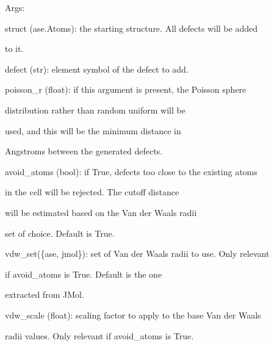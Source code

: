 \documentclass[letterpaper,10pt,english]{sphinxmanual}
\begin{document}
\begin{fulllineitems}
\begin{DUlineblock}{0em}
\item[] Args:
\item[]
\begin{DUlineblock}{\DUlineblockindent}
\item[] struct (ase.Atoms): the starting structure. All defects will be added
\item[]
\begin{DUlineblock}{\DUlineblockindent}
\item[] to it.
\end{DUlineblock}
\item[] defect (str): element symbol of the defect to add.
\item[] poisson\_r (float): if this argument is present, the Poisson sphere
\item[]
\begin{DUlineblock}{\DUlineblockindent}
\item[] distribution rather than random uniform will be
\item[] used, and this will be the minimum distance in
\item[] Angstroms between the generated defects.
\end{DUlineblock}
\item[] avoid\_atoms (bool): if True, defects too close to the existing atoms
\item[]
\begin{DUlineblock}{\DUlineblockindent}
\item[] in the cell will be rejected. The cutoff distance
\item[] will be estimated based on the Van der Waals radii
\item[] set of choice. Default is True.
\end{DUlineblock}
\item[] vdw\_set(\{ase, jmol\}): set of Van der Waals radii to use. Only relevant
\item[]
\begin{DUlineblock}{\DUlineblockindent}
\item[] if avoid\_atoms is True. Default is the one
\item[] extracted from JMol.
\end{DUlineblock}
\item[] vdw\_scale (float): scaling factor to apply to the base Van der Waals
\item[]
\begin{DUlineblock}{\DUlineblockindent}
\item[] radii values. Only relevant if avoid\_atoms is True.

\end{DUlineblock}
\end{DUlineblock}
\end{DUlineblock}
\end{fulllineitems}
\end{document}
